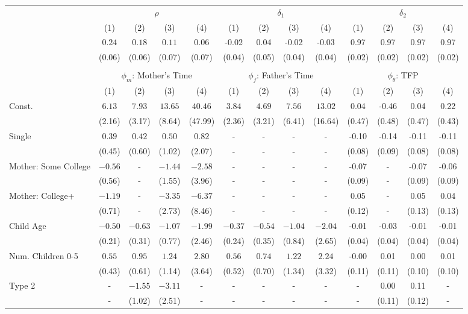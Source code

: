 \begin{tabular}{lcccccccccccc}\\\toprule
 & \multicolumn{4}{c}{$\rho$} & \multicolumn{4}{c}{$\delta_{1}$} & \multicolumn{4}{c}{$\delta_{2}$} \\
&(1)&(2)&(3)&(4)&(1)&(2)&(3)&(4)&(1)&(2)&(3)&(4)\\\cmidrule(r){2-5}\cmidrule(r){6-9}\cmidrule(r){10-13}
&$0.24$&$0.18$&$0.11$&$0.06$&-0.02&0.04&-0.02&-0.03&0.97&0.97&0.97&0.97\\
&(0.06)&(0.06)&(0.07)&(0.07)&(0.04)&(0.05)&(0.04)&(0.04)&(0.02)&(0.02)&(0.02)&(0.02)\\
&&&&&&&&&&&&\\
 & \multicolumn{4}{c}{$\phi_{m}$: Mother's Time} & \multicolumn{4}{c}{$\phi_{f}$: Father's Time} & \multicolumn{4}{c}{$\phi_{\theta}$: TFP} \\
&(1)&(2)&(3)&(4)&(1)&(2)&(3)&(4)&(1)&(2)&(3)&(4)\\\cmidrule(r){2-5}\cmidrule(r){6-9}\cmidrule(r){10-13}
Const.&$6.13$&$7.93$&$13.65$&$40.46$&$3.84$&$4.69$&$7.56$&$13.02$&0.04&-0.46&0.04&0.22\\
&(2.16)&(3.17)&(8.64)&(47.99)&(2.36)&(3.21)&(6.41)&(16.64)&(0.47)&(0.48)&(0.47)&(0.43)\\
Single&$0.39$&$0.42$&$0.50$&$0.82$&-&-&-&-&-0.10&-0.14&-0.11&-0.11\\
&(0.45)&(0.60)&(1.02)&(2.07)&-&-&-&-&(0.08)&(0.09)&(0.08)&(0.08)\\
Mother: Some College&$-0.56$&-&$-1.44$&$-2.58$&-&-&-&-&-0.07&-&-0.07&-0.06\\
&(0.56)&-&(1.55)&(3.96)&-&-&-&-&(0.09)&-&(0.09)&(0.09)\\
Mother: College+&$-1.19$&-&$-3.35$&$-6.37$&-&-&-&-&0.05&-&0.05&0.04\\
&(0.71)&-&(2.73)&(8.46)&-&-&-&-&(0.12)&-&(0.13)&(0.13)\\
Child Age&$-0.50$&$-0.63$&$-1.07$&$-1.99$&$-0.37$&$-0.54$&$-1.04$&$-2.04$&-0.01&-0.03&-0.01&-0.01\\
&(0.21)&(0.31)&(0.77)&(2.46)&(0.24)&(0.35)&(0.84)&(2.65)&(0.04)&(0.04)&(0.04)&(0.04)\\
Num. Children 0-5&$0.55$&$0.95$&$1.24$&$2.80$&$0.56$&$0.74$&$1.22$&$2.24$&-0.00&0.01&0.00&0.01\\
&(0.43)&(0.61)&(1.14)&(3.64)&(0.52)&(0.70)&(1.34)&(3.32)&(0.11)&(0.11)&(0.10)&(0.10)\\
Type 2&-&$-1.55$&$-3.11$&-&-&-&-&-&-&0.00&0.11&-\\
&-&(1.02)&(2.51)&-&-&-&-&-&-&(0.11)&(0.12)&-\\

\end{tabular}
